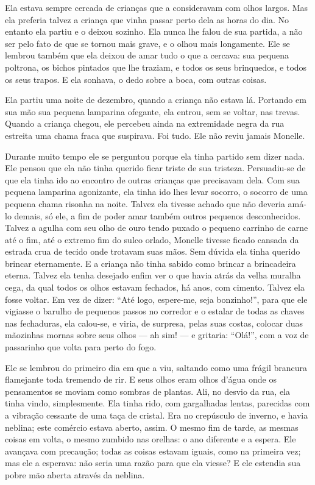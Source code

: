 Ela estava sempre cercada de crianças que a consideravam com olhos
largos. Mas ela preferia talvez a criança que vinha passar perto dela as
horas do dia. No entanto ela partiu e o deixou sozinho. Ela nunca lhe
falou de sua partida, a não ser pelo fato de que se tornou mais grave, e o
olhou mais longamente. Ele se lembrou também que ela deixou de amar tudo o
que a cercava: sua pequena poltrona, os bichos pintados que lhe traziam, e
todos os seus brinquedos, e todos os seus trapos. E ela sonhava, o dedo
sobre a boca, com outras coisas.

Ela partiu uma noite de dezembro, quando a criança não estava lá.
Portando em sua mão sua pequena lamparina ofegante, ela entrou, sem se
voltar, nas trevas. Quando a criança chegou, ele percebeu ainda na
extremidade negra da rua estreita uma chama fraca que suspirava. Foi tudo.
Ele não reviu jamais Monelle.

Durante muito tempo ele se perguntou porque ela tinha partido sem
dizer nada. Ele pensou que ela não tinha querido ficar triste de sua
tristeza. Persuadiu-se de que ela tinha ido ao encontro de outras crianças
que precisavam dela. Com sua pequena lamparina agonizante, ela tinha ido
lhes levar socorro, o socorro de uma pequena chama risonha na noite.
Talvez ela tivesse achado que não deveria amá-lo demais, só ele, a fim de
poder amar também outros pequenos desconhecidos. Talvez a agulha com seu
olho de ouro tendo puxado o pequeno carrinho de carne até o fim, até o
extremo fim do sulco orlado, Monelle tivesse ficado cansada da estrada
crua de tecido onde trotavam suas mãos. Sem dúvida ela tinha querido
brincar eternamente. E a criança não tinha sabido como brincar a
brincadeira eterna. Talvez ela tenha desejado enfim ver o que havia atrás
da velha muralha cega, da qual todos os olhos estavam fechados, há anos,
com cimento. Talvez ela fosse voltar. Em vez de dizer: “Até logo,
espere-me, seja bonzinho!”, para que ele vigiasse o barulho de pequenos
passos no corredor e o estalar de todas as chaves nas fechaduras, ela
calou-se, e viria, de surpresa, pelas suas costas, colocar duas mãozinhas
mornas sobre seus olhos --- ah sim! --- e gritaria: “Olá!”, com a voz de
passarinho que volta para perto do fogo.

Ele se lembrou do primeiro dia em que a viu, saltando como uma frágil
brancura flamejante toda tremendo de rir. E seus olhos eram olhos d'água
onde os pensamentos se moviam como sombras de plantas. Ali, no desvio da
rua, ela tinha vindo, simplesmente. Ela tinha rido, com gargalhadas
lentas, parecidas com a vibração cessante de uma taça de cristal. Era no
crepúsculo de inverno, e havia neblina; este comércio estava aberto, assim. O
mesmo fim de tarde, as mesmas coisas em volta, o mesmo zumbido nas orelhas: o ano
diferente e a espera. Ele avançava com precaução; todas as coisas estavam
iguais, como na primeira vez; mas ele a esperava: não seria uma razão para
que ela viesse? E ele estendia sua pobre mão aberta através da neblina.


